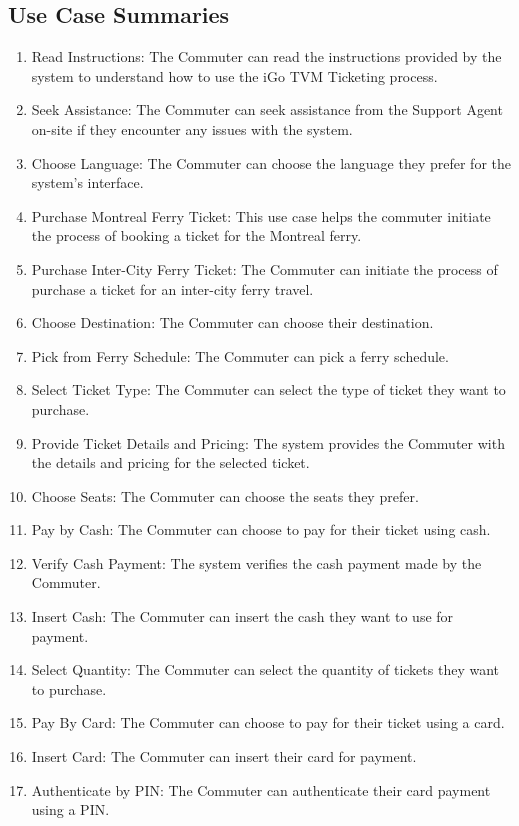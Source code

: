 \documentclass[letterpaper]{report}
\begin{document}
\subsection{Use Case Summaries}
\begin{enumerate}[label=UC-\arabic*]
    \item Read Instructions: The Commuter can read the instructions provided by the system to understand how to use the iGo TVM Ticketing process.
    \item Seek Assistance: The Commuter can seek assistance from the Support Agent on-site if they encounter any issues with the system.
    \item Choose Language: The Commuter can choose the language they prefer for the system's interface.
     \item Purchase Montreal Ferry Ticket: This use case helps the commuter initiate the process of booking a ticket for the Montreal ferry.
    \item Purchase Inter-City Ferry Ticket: The Commuter can initiate the process of purchase a ticket for an inter-city ferry travel.
    \item Choose Destination: The Commuter can choose their destination.
    \item Pick from Ferry Schedule: The Commuter can pick a ferry schedule.
    \item Select Ticket Type: The Commuter can select the type of ticket they want to purchase.
    \item Provide Ticket Details and Pricing: The system provides the Commuter with the details and pricing for the selected ticket.
    \item Choose Seats: The Commuter can choose the seats they prefer.
    \item Pay by Cash: The Commuter can choose to pay for their ticket using cash.
    \item Verify Cash Payment: The system verifies the cash payment made by the Commuter.
    \item Insert Cash: The Commuter can insert the cash they want to use for payment.
    \item Select Quantity: The Commuter can select the quantity of tickets they want to purchase.
    \item Pay By Card: The Commuter can choose to pay for their ticket using a card.
    \item Insert Card: The Commuter can insert their card for payment.
    \item Authenticate by PIN: The Commuter can authenticate their card payment using a PIN.

\end{enumerate}
\end{document}
